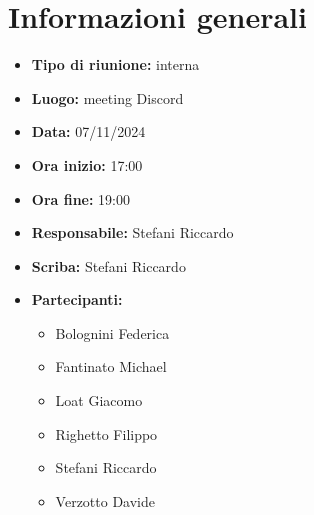 


\section{Informazioni generali}

\begin{itemize}
    \item \textbf{Tipo di riunione:} interna
    \item \textbf{Luogo:} meeting Discord
    \item \textbf{Data:} 07/11/2024
    \item \textbf{Ora inizio:} 17:00
    \item \textbf{Ora fine:} 19:00
    \item \textbf{Responsabile:} Stefani Riccardo
    \item \textbf{Scriba:} Stefani Riccardo
    \item \textbf{Partecipanti:}
    \begin{itemize}
        \renewcommand{\labelitemii}{--}
        \item Bolognini Federica
        \item Fantinato Michael
        \item Loat Giacomo
        \item Righetto Filippo
        \item Stefani Riccardo
        \item Verzotto Davide
    \end{itemize}
\end{itemize}
